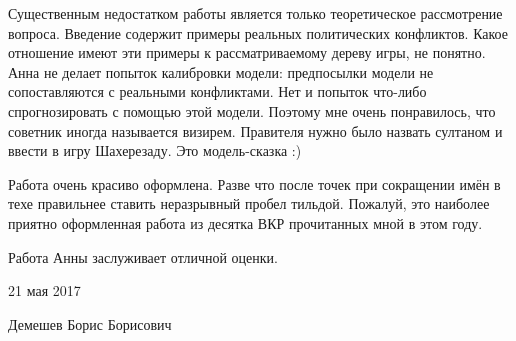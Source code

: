\documentclass[a4paper, 12pt]{article}
\begin{document}
Существенным недостатком работы является только теоретическое
рассмотрение вопроса. Введение содержит примеры реальных политических
конфликтов. Какое отношение имеют эти примеры к рассматриваемому дереву
игры, не понятно. Анна не делает попыток калибровки модели: предпосылки
модели не сопоставляются с реальными конфликтами. Нет и попыток что-либо
спрогнозировать с помощью этой модели. Поэтому мне очень понравилось,
что советник иногда называется визирем. Правителя нужно было назвать
султаном и ввести в игру Шахерезаду. Это модель-сказка :)

Работа очень красиво оформлена. Разве что после точек при сокращении
имён в техе правильнее ставить неразрывный пробел тильдой. Пожалуй, это
наиболее приятно оформленная работа из десятка ВКР прочитанных мной в
этом году.

Работа Анны заслуживает отличной оценки.

\vspace{1cm}

21 мая 2017

Демешев Борис Борисович
\end{document}
